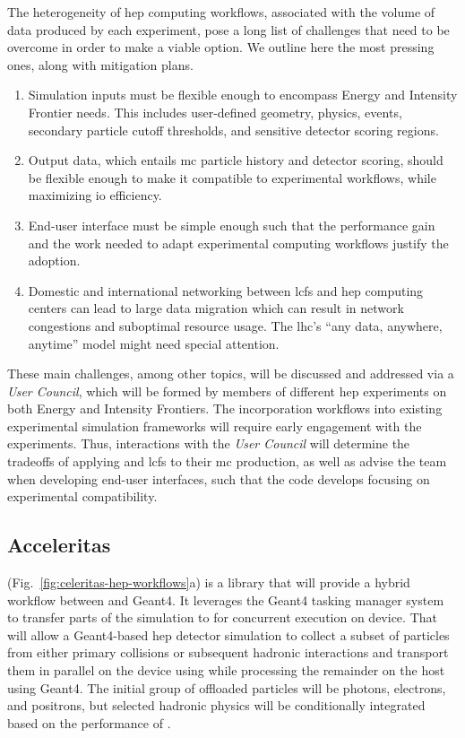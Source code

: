 The heterogeneity of \ac{hep} computing workflows, associated with the volume of
data produced by each experiment, pose a long list of challenges that need to be
overcome in order to make \celeritas a viable option. We outline here the most pressing ones, along with mitigation plans. 
\begin{enumerate}[itemsep=0pt]
  \item Simulation inputs must be flexible enough to encompass Energy and
    Intensity Frontier needs. This includes user-defined geometry, physics,
    events, secondary particle cutoff thresholds, and sensitive detector scoring
    regions.
  \item Output data, which entails \ac{mc} particle history and detector
    scoring, should be flexible enough to make it compatible to experimental
    workflows, while maximizing \ac{io} efficiency.
  \item End-user interface must be simple enough such that the performance gain
    and the work needed to adapt experimental computing workflows justify the
    adoption.
  \item Domestic and international networking between \acp{lcf} and \ac{hep}
    computing centers can lead to large data migration which can result in
    network congestions and suboptimal resource usage.  The \ac{lhc}'s ``any
    data, anywhere, anytime'' model \cite{hep-network-requirements} might need
    special attention.
\end{enumerate}

These main challenges, among other topics, will be discussed and addressed via a
\celeritas \emph{User Council}, which will be formed by members of different
\ac{hep} experiments on both Energy and Intensity Frontiers. The incorporation
\celeritas workflows into existing experimental simulation frameworks will
require early engagement with the experiments. Thus, interactions with the
\emph{User Council} will determine the tradeoffs of applying \celeritas and
\acp{lcf} to their \ac{mc} production, as well as advise the \celeritas team
when developing end-user interfaces, such that the code develops focusing on
experimental compatibility.

\subsection{Acceleritas}
\label{sec:acceleritas}

\acceleritas (Fig.~\ref{fig:celeritas-hep-workflows}a) is a library that will
provide a hybrid workflow between \celeritas and Geant4. It leverages the Geant4
tasking manager system to transfer parts of the simulation to \celeritas for
concurrent execution on device. That will allow a Geant4-based \ac{hep} detector
simulation to collect a subset of particles from either primary collisions or
subsequent hadronic interactions and transport them in parallel on the device
using \celeritas while processing the remainder on the host using Geant4.  The
initial group of offloaded particles will be photons, electrons, and positrons,
but selected hadronic physics will be conditionally integrated based on the
performance of \acceleritas.

